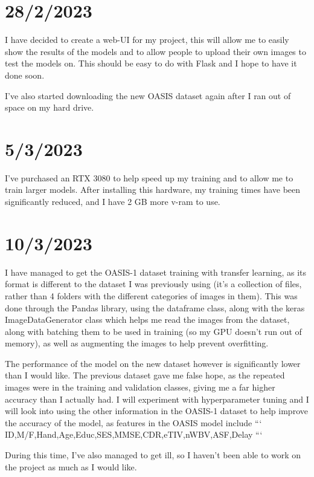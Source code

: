 \documentclass[]{final_report}
\begin{document}
\section*{28/2/2023}

I have decided to create a web-UI for my project, this will allow me to easily show the results of the models and to allow people to upload their own images to test the models on. This should be easy to do with Flask and I hope to have it done soon.

I've also started downloading the new OASIS dataset again after I ran out of space on my hard drive.

\section*{5/3/2023}

I've purchased an RTX 3080 to help speed up my training and to allow me to train larger models. After installing this hardware, my training times have been significantly reduced, and I have 2 GB more v-ram to use.

\section*{10/3/2023}

I have managed to get the OASIS-1 dataset training with transfer learning, as its format is different to the dataset I was previously using (it's a collection of files, rather than 4 folders with the different categories of images in them). This was done through the Pandas library, using the dataframe class, along with the keras ImageDataGenerator class which helps me read the images from the dataset, along with batching them to be used in training (so my GPU doesn't run out of memory), as well as augmenting the images to help prevent overfitting.

The performance of the model on the new dataset however is significantly lower than I would like. The previous dataset gave me false hope, as the repeated images were in the training and validation classes, giving me a far higher accuracy than I actually had. I will experiment with hyperparameter tuning and I will look into using the other information in the OASIS-1 dataset to help improve the accuracy of the model, as features in the OASIS model include
```
ID,M/F,Hand,Age,Educ,SES,MMSE,CDR,eTIV,nWBV,ASF,Delay
```

During this time, I've also managed to get ill, so I haven't been able to work on the project as much as I would like.
\end{document}
